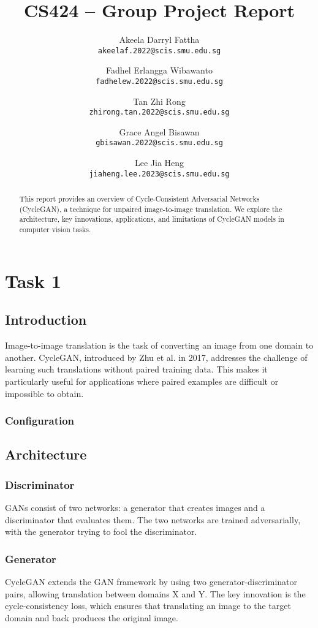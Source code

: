 \documentclass[twoside,english,notitlepage]{report}
\title{CS424 – Group Project Report}
\author{
    Akeela Darryl Fattha\\
    \texttt{akeelaf.2022@scis.smu.edu.sg}
    \and
    Fadhel Erlangga Wibawanto\\
    \texttt{fadhelew.2022@scis.smu.edu.sg}
    \and
    Tan Zhi Rong\\
    \texttt{zhirong.tan.2022@scis.smu.edu.sg}
    \and
    Grace Angel Bisawan \\
    \texttt{gbisawan.2022@scis.smu.edu.sg}
    \and
    Lee Jia Heng\\
    \texttt{jiaheng.lee.2023@scis.smu.edu.sg}
}
\begin{document}
\date{}
\maketitle
\begin{abstract}
This report provides an overview of Cycle-Consistent Adversarial Networks (CycleGAN), a technique for unpaired image-to-image translation. We explore the architecture, key innovations, applications, and limitations of CycleGAN models in computer vision tasks.
\end{abstract}
\tableofcontents


\chapter{Task 1}

\section{Introduction}
Image-to-image translation is the task of converting an image from one domain to another. CycleGAN, introduced by Zhu et al. in 2017, addresses the challenge of learning such translations without paired training data. This makes it particularly useful for applications where paired examples are difficult or impossible to obtain.

\subsection{Configuration}





\section{Architecture}
\subsection{Discriminator}
GANs consist of two networks: a generator that creates images and a discriminator that evaluates them. The two networks are trained adversarially, with the generator trying to fool the discriminator.

\subsection{Generator}
CycleGAN extends the GAN framework by using two generator-discriminator pairs, allowing translation between domains X and Y. The key innovation is the cycle-consistency loss, which ensures that translating an image to the target domain and back produces the original image.
\end{document}
